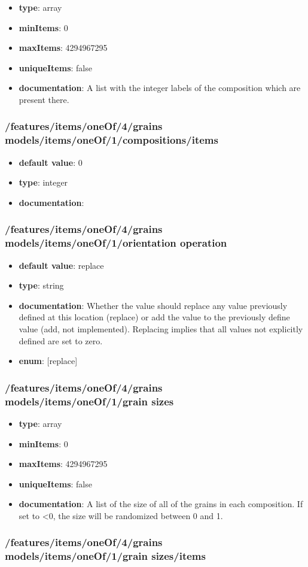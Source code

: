 \begin{itemize}\item {\bf type}: array
\item {\bf minItems}: 0
\item {\bf maxItems}: 4294967295
\item {\bf uniqueItems}: false
\item {\bf documentation}: A list with the integer labels of the composition which are present there.
\end{itemize}\subsubsection{/features/items/oneOf/4/grains models/items/oneOf/1/compositions/items}
\begin{itemize}\item {\bf default value}: 0
\item {\bf type}: integer
\item {\bf documentation}: 
\end{itemize}\subsubsection{/features/items/oneOf/4/grains models/items/oneOf/1/orientation operation}
\begin{itemize}\item {\bf default value}: replace
\item {\bf type}: string
\item {\bf documentation}: Whether the value should replace any value previously defined at this location (replace) or add the value to the previously define value (add, not implemented). Replacing implies that all values not explicitly defined are set to zero.
\item {\bf enum}: [replace]\end{itemize}\subsubsection{/features/items/oneOf/4/grains models/items/oneOf/1/grain sizes}
\begin{itemize}\item {\bf type}: array
\item {\bf minItems}: 0
\item {\bf maxItems}: 4294967295
\item {\bf uniqueItems}: false
\item {\bf documentation}: A list of the size of all of the grains in each composition. If set to <0, the size will be randomized between 0 and 1.
\end{itemize}\subsubsection{/features/items/oneOf/4/grains models/items/oneOf/1/grain sizes/items}
